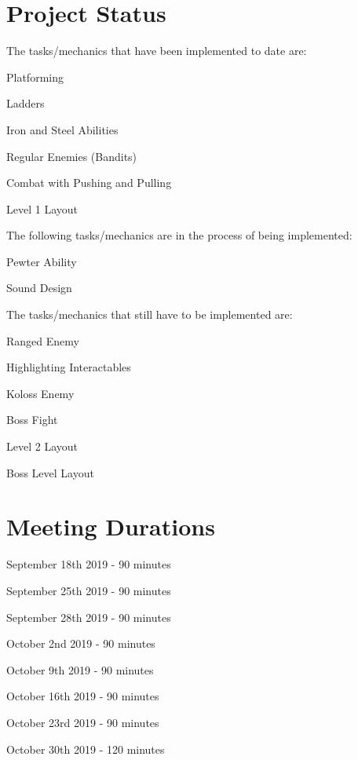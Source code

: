 \documentclass{article}
\begin{document}
\section{Project Status}
The tasks/mechanics that have been implemented to date are:
\begin{description}
	\item Platforming
	\item Ladders
	\item Iron and Steel Abilities
	\item Regular Enemies (Bandits)
	\item Combat with Pushing and Pulling
	\item Level 1 Layout
	\end{description}
The following tasks/mechanics are in the process of being implemented:
\begin{description}
	\item Pewter Ability
	\item Sound Design
	\end{description}
The tasks/mechanics that still have to be implemented are:
\begin{description}
	\item Ranged Enemy
	\item Highlighting Interactables
	\item Koloss Enemy
	\item Boss Fight
	\item Level 2 Layout
	\item Boss Level Layout
	\end{description}

\section{Meeting Durations}
\begin{description}
	\item September 18th 2019 - 90 minutes
	\item September 25th 2019 - 90 minutes
	\item September 28th 2019 - 90 minutes
	\item October 2nd 2019 - 90 minutes
	\item October 9th 2019 - 90 minutes
	\item October 16th 2019 - 90 minutes
	\item October 23rd 2019 - 90 minutes
	\item October 30th 2019 - 120 minutes
	\end{description}
\end{document}
